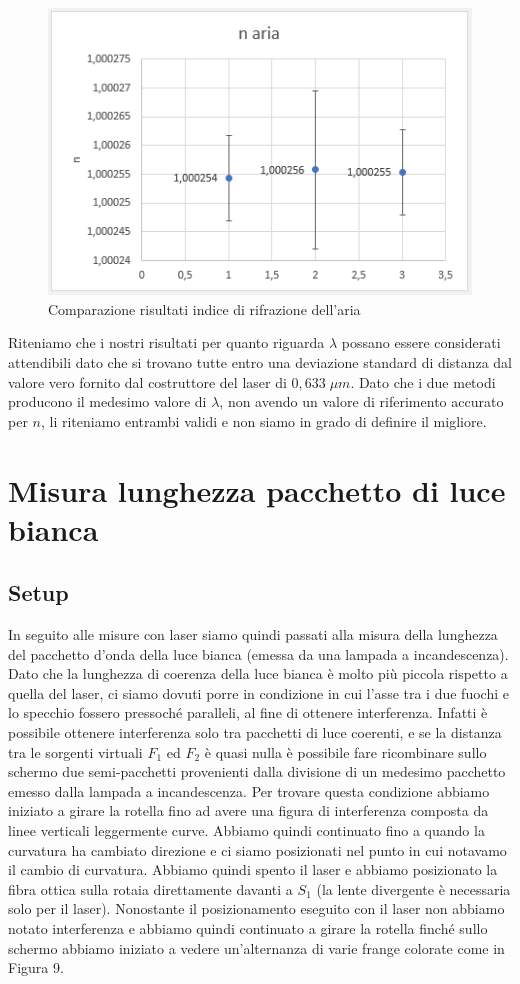 \documentclass{article}
\begin{document}
\begin{figure}[h!]
  \centering
  \includegraphics[width=0.6\linewidth]{IM grafico risultati n}
  \caption{Comparazione risultati indice di rifrazione dell'aria}
\end{figure}


Riteniamo che i nostri risultati per quanto riguarda $\lambda$ possano essere considerati attendibili dato che si trovano tutte entro una deviazione standard di distanza dal valore vero fornito dal costruttore del laser di $0,633 \; \mu m$. Dato che i due metodi producono il medesimo valore di $\lambda$, non avendo un valore di riferimento accurato per $n$, li riteniamo entrambi validi e non siamo in grado di definire il migliore.



\section{Misura lunghezza pacchetto di luce bianca}

\subsection{Setup}
In seguito alle misure con laser siamo quindi passati alla misura della lunghezza del pacchetto d'onda della luce bianca (emessa da una lampada a incandescenza). Dato che la lunghezza di coerenza della luce bianca è molto più piccola rispetto a quella del laser, ci siamo dovuti porre in condizione in cui l'asse tra i due fuochi e lo specchio fossero pressoché paralleli, al fine di ottenere interferenza. Infatti è possibile ottenere interferenza solo tra pacchetti di luce coerenti, e se la distanza tra le sorgenti virtuali $F_1$ ed $F_2$ è quasi nulla è possibile fare ricombinare sullo schermo due semi-pacchetti provenienti dalla divisione di un medesimo pacchetto emesso dalla lampada a incandescenza. Per trovare questa condizione abbiamo iniziato a girare la rotella fino ad avere una figura di interferenza composta da linee verticali leggermente curve. Abbiamo quindi continuato fino a quando la curvatura ha cambiato direzione e ci siamo posizionati nel punto in cui notavamo il cambio di curvatura. Abbiamo quindi spento il laser e abbiamo posizionato la fibra ottica sulla rotaia direttamente davanti a $S_1$ (la lente divergente è necessaria solo per il laser). Nonostante il posizionamento eseguito con il laser non abbiamo notato interferenza e abbiamo quindi continuato a girare la rotella finché sullo schermo abbiamo iniziato a vedere un'alternanza di varie frange colorate come in Figura 9.
\end{document}
